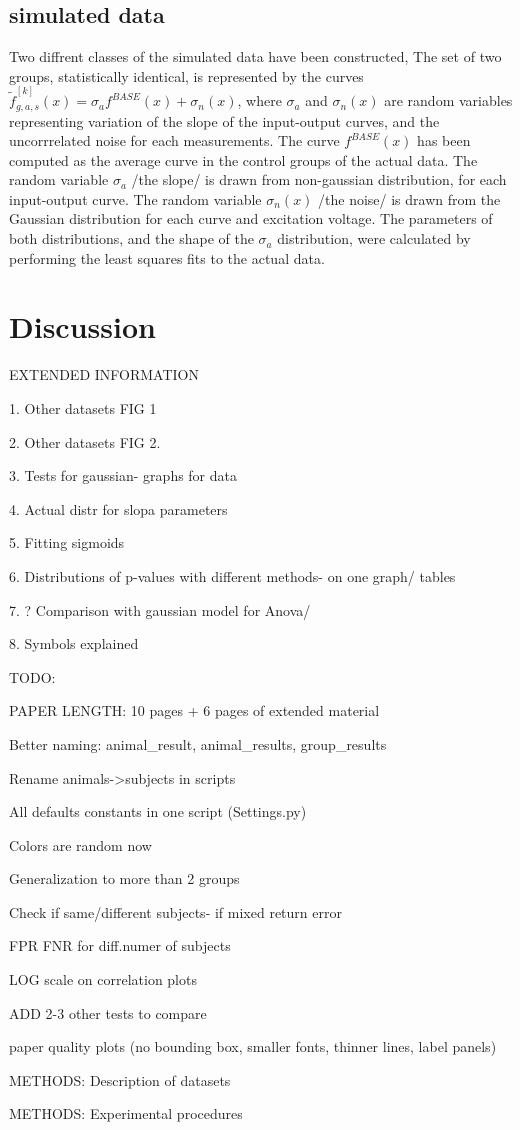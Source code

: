 \documentclass[fleqn,10pt]{wlscirep}
\begin{document}
\subsection{simulated data}
Two diffrent classes of the simulated data have been constructed,
The set of two groups, statistically identical, is represented by the curves 
$\tilde{f}^{[k]}_{g,a,s}(x)=\sigma _{a}f^{BASE}(x)+\sigma _{n}(x)$, where $\sigma _{a}$ and $\sigma _{n}(x)$ are random variables representing variation of the slope of the input-output curves, and the uncorrrelated noise for each measurements. The curve $f^{BASE}(x)$ has been computed as the average curve in the control groups of the actual data. The random variable $\sigma _{a}$ /the slope/ is drawn from non-gaussian distribution, for each input-output curve. The random variable $\sigma _{n}(x)$ /the noise/ is drawn from the Gaussian distribution for each curve and excitation voltage. The parameters of both distributions, and the shape of the  $\sigma _{a}$ distribution, were calculated by performing the least squares fits to the actual data. 
\section{Discussion}

  

\newpage

EXTENDED INFORMATION

1. Other datasets FIG 1 

2. Other datasets FIG 2.

3. Tests for gaussian- graphs for data

4. Actual distr for slopa parameters

5. Fitting sigmoids

6. Distributions of p-values with different methods- on one graph/ tables

7. ? Comparison with gaussian model for Anova/

8. Symbols explained
\newpage

TODO:

PAPER LENGTH: 10 pages + 6 pages of extended material

Better naming: animal\_result, animal\_results, group\_results

Rename animals->subjects in scripts

All defaults constants in one script (Settings.py)

Colors are random now

Generalization to more than 2 groups

Check if same/different subjects- if mixed return error

FPR FNR for diff.numer of subjects

LOG scale on correlation plots

ADD 2-3 other tests to compare

paper quality plots (no bounding box, smaller fonts, thinner lines, label panels)

METHODS: Description of datasets

METHODS: Experimental procedures


 
\end{document}
